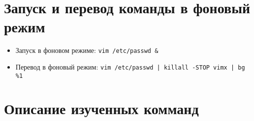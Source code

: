 \documentclass[12pt, a4paper]{article}
\begin{document}


\section{Запуск и перевод команды в фоновый режим}
\begin{itemize}
  \item Запуск в фоновом режиме: \texttt{vim /etc/passwd \&}
  \item Перевод в фоновый режим: \texttt{vim /etc/passwd | killall -STOP vimx | bg \%1}
\end{itemize}

\section{Описание изученных комманд}
\end{document}
